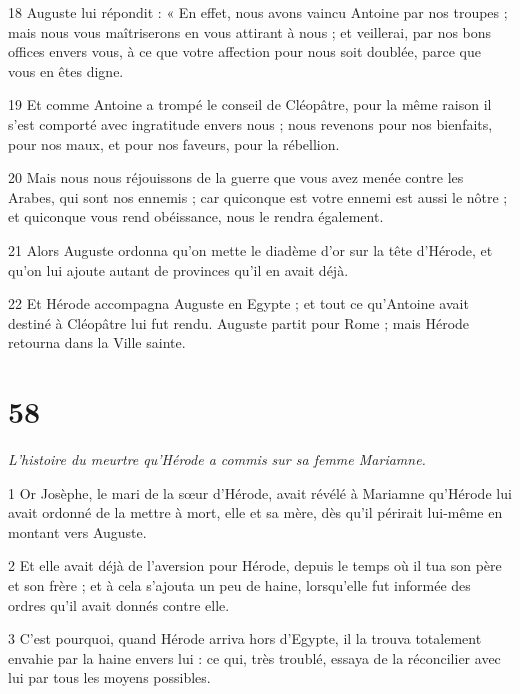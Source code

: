 \par 18 Auguste lui répondit : « En effet, nous avons vaincu Antoine par nos troupes ; mais nous vous maîtriserons en vous attirant à nous ; et veillerai, par nos bons offices envers vous, à ce que votre affection pour nous soit doublée, parce que vous en êtes digne.

\par 19 Et comme Antoine a trompé le conseil de Cléopâtre, pour la même raison il s'est comporté avec ingratitude envers nous ; nous revenons pour nos bienfaits, pour nos maux, et pour nos faveurs, pour la rébellion.

\par 20 Mais nous nous réjouissons de la guerre que vous avez menée contre les Arabes, qui sont nos ennemis ; car quiconque est votre ennemi est aussi le nôtre ; et quiconque vous rend obéissance, nous le rendra également.

\par 21 Alors Auguste ordonna qu'on mette le diadème d'or sur la tête d'Hérode, et qu'on lui ajoute autant de provinces qu'il en avait déjà.

\par 22 Et Hérode accompagna Auguste en Egypte ; et tout ce qu'Antoine avait destiné à Cléopâtre lui fut rendu. Auguste partit pour Rome ; mais Hérode retourna dans la Ville sainte.

\chapter{58}

\par \textit{L'histoire du meurtre qu'Hérode a commis sur sa femme Mariamne.}

\par 1 Or Josèphe, le mari de la sœur d'Hérode, avait révélé à Mariamne qu'Hérode lui avait ordonné de la mettre à mort, elle et sa mère, dès qu'il périrait lui-même en montant vers Auguste.

\par 2 Et elle avait déjà de l'aversion pour Hérode, depuis le temps où il tua son père et son frère ; et à cela s'ajouta un peu de haine, lorsqu'elle fut informée des ordres qu'il avait donnés contre elle.

\par 3 C'est pourquoi, quand Hérode arriva hors d'Egypte, il la trouva totalement envahie par la haine envers lui : ce qui, très troublé, essaya de la réconcilier avec lui par tous les moyens possibles.

